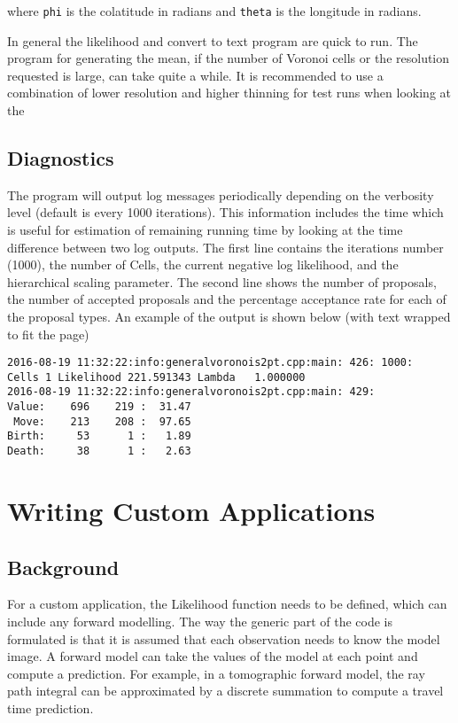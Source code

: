 \documentclass[a4paper,12pt]{article}
\begin{document}
where {\tt phi} is the colatitude in radians and {\tt theta} is the longitude in radians.

In general the likelihood and convert to text program are quick to run. The program for
generating the mean, if the number of Voronoi cells or the resolution requested is large,
can take quite a while. It is recommended to use a combination of lower resolution and
higher thinning for test runs when looking at the 

\subsection{Diagnostics}

The program will output log messages periodically depending on the verbosity level (default is
every 1000 iterations). This information includes the time which is useful for estimation of
remaining running time by looking at the time difference between two log outputs.
The first line contains the iterations number (1000), the number of Cells, the current negative log likelihood,
and the hierarchical scaling parameter. The second line shows the number of proposals, the number of
accepted proposals and the percentage acceptance rate for each of the proposal types. An example of
the output is shown below (with text wrapped to fit the page)

\begin{verbatim}
2016-08-19 11:32:22:info:generalvoronois2pt.cpp:main: 426: 1000: 
Cells 1 Likelihood 221.591343 Lambda   1.000000
2016-08-19 11:32:22:info:generalvoronois2pt.cpp:main: 429:         
Value:    696    219 :  31.47
 Move:    213    208 :  97.65
Birth:     53      1 :   1.89
Death:     38      1 :   2.63
\end{verbatim}

\section{Writing Custom Applications}

\subsection{Background}

For a custom application, the Likelihood function needs to be defined, which can
include any forward modelling.
The way the generic part of the code is formulated is that it is assumed that each
observation needs to know the model image. A forward model
can take the values of the model at each point and compute a prediction. For
example, in a tomographic forward model, the ray path integral can be approximated by a discrete
summation to compute a travel time prediction.
\end{document}
